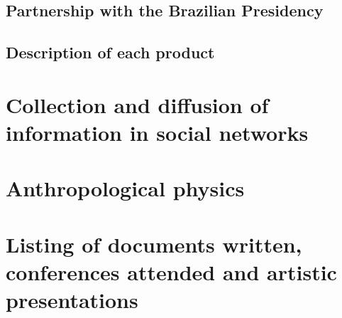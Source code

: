 \begin{apendicesenv}
\subsection{Partnership with the Brazilian Presidency}
\subsection{Description of each product}
\section{Collection and diffusion of information in social networks}
\section{Anthropological physics}
\section{Listing of documents written, conferences attended and artistic presentations}

\end{apendicesenv}
